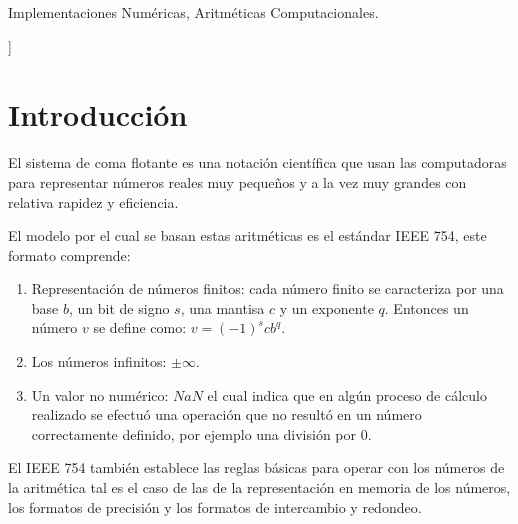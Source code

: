 \documentclass[a4paper,10pt,twocolumn]{article}
\begin{document}
\begin{keywords}
	Implementaciones Numéricas,
	Aritméticas Computacionales.
\end{keywords}

\vspace{0.8cm}
]



\section{Introducción}\label{sec:intro}
	El sistema de coma flotante es una notación científica que usan las computadoras para representar números reales muy pequeños y a la vez muy grandes con relativa rapidez y eficiencia.
  
	El modelo por el cual se basan estas aritméticas es el estándar IEEE 754, este formato comprende:
	\begin{enumerate}
  
  		\item Representación de números finitos: cada número finito se caracteriza por una base $b$, un bit de signo $s$, una mantisa $c$ y un exponente $q$. Entonces un número $v$ se define como: $v=(-1)^s c b^q$. 
  	
  		\item Los números infinitos: $\pm\infty$.
  	
  		\item Un valor no numérico: $NaN$ el cual indica que en algún proceso de cálculo realizado se efectuó una operación que no resultó en un número correctamente definido, por ejemplo una división por 0.
	\end{enumerate}
  
	El IEEE 754 también establece las reglas básicas para operar con los números de la aritmética tal es el caso de las de la representación en memoria de los números, los formatos de precisión y los formatos de intercambio y redondeo.
  
\end{document}
